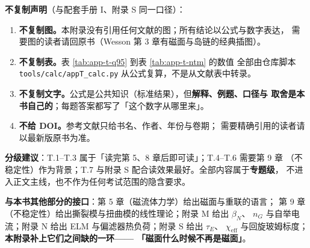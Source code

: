 \textbf{不复制声明}（与配套手册 I、附录 S 同一口径）：

\begin{enumerate}
  \item \textbf{不复制图。}本附录没有引用任何文献的图；所有结论以公式与数字表达，
        需要图的读者请回原书（Wesson 第 3 章有磁面与岛链的经典插图）。
  \item \textbf{不复制表。}表 \ref{tab:app-t-q95} 到表 \ref{tab:app-t-ntm} 的数值
        全部由仓库脚本 \texttt{tools/\allowbreak{}calc/\allowbreak{}appT\_calc.py} 从公式复算，不是从文献表中转录。
  \item \textbf{不复制文字。}公式是公共知识（标准结果），但\textbf{解释、例题、口径与
        取舍是本书自己的}；每题答案都写了「这个数字从哪里来」。
  \item \textbf{不给 DOI。}参考文献只给书名、作者、年份与卷期；
        需要精确引用的读者请以最新版原书为准。
\end{enumerate}

\textbf{分级建议}：T.1--T.3 属于「读完第 5、8 章后即可读」；T.4--T.6 需要第 9 章
（不稳定性）作为背景；T.7 与附录 S 配合读效果最好。全部内容属于\textbf{专题级}，
不进入正文主线，也不作为任何考试范围的隐含要求。

\textbf{与本书其他部分的接口}：第 5 章（磁流体力学）给出磁面与重联的语言；
第 9 章（不稳定性）给出撕裂模与扭曲模的线性理论；附录 M 给出 $\beta_N$、
$n_G$ 与自举电流；附录 N 给出 ELM 与偏滤器热负荷；附录 S 给出 $\tau_E$、
$\chi_{\mathrm{eff}}$ 与回旋玻姆标度；\textbf{本附录补上它们之间缺的一环——
「磁面什么时候不再是磁面」}。
\endgroup
